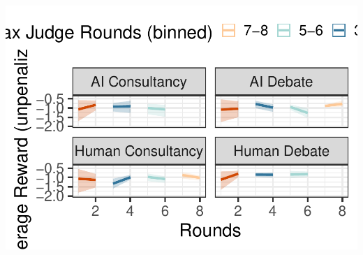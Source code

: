 \documentclass[
]{article}
\begin{document}
\includegraphics{debate-2309_files/figure-latex/strat ggplot-4.pdf}
\end{document}
